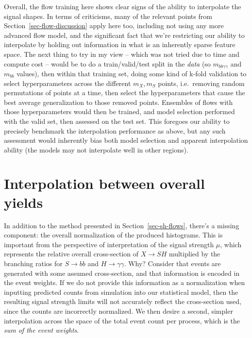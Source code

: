 \documentclass[
  11pt,
  numbers=noendperiod]{book}
\begin{document}
Overall, the flow training here shows clear signs of the ability to
interpolate the signal shapes. In terms of criticisms, many of the
relevant points from Section~\ref{sec-flow-discussion} apply here too,
including not using any more advanced flow model, and the significant
fact that we're restricting our ability to interpolate by holding out
information in what is an inherently sparse feature space. The next
thing to try in my view -- which was not tried due to time and compute
cost -- would be to do a train/valid/test split in the \emph{data} (so
\(m_{bb\gamma\gamma}\) and \(m_{bb}\) values), then within that training
set, doing some kind of k-fold validation to select hyperparameters
across the different \(m_X, m_S\) points, i.e.~removing random
permutations of points at a time, then select the hyperparameters that
cause the best average generalization to those removed points. Ensembles
of flows with those hyperparameters would then be trained, and model
selection performed with the valid set, then assessed on the test set.
This foregoes our ability to precisely benchmark the interpolation
performance as above, but any such assessment would inherently bias both
model selection and apparent interpolation ability (the models may not
interpolate well in other regions).

\hypertarget{interpolation-between-overall-yields}{%
\section{Interpolation between overall
yields}\label{interpolation-between-overall-yields}}

In addition to the method presented in Section~\ref{sec-sh-flows},
there's a missing component: the overall normalization of the produced
histograms. This is important from the perspective of interpretation of
the signal strength \(\mu\), which represents the relative overall
cross-section of \(X\rightarrow SH\) multiplied by the branching ratios
for \(S \rightarrow bb\) and \(H \rightarrow \gamma\gamma\). Why?
Consider that events are generated with some assumed cross-section, and
that information is encoded in the event weights. If we do not provide
this information as a normalization when inputting predicted counts from
simulation into our statistical model, then the resulting signal
strength limits will not accurately reflect the cross-section used,
since the counts are incorrectly normalized. We then desire a second,
simpler interpolation across the space of the total event count per
process, which is the \emph{sum of the event weights}.
\end{document}
